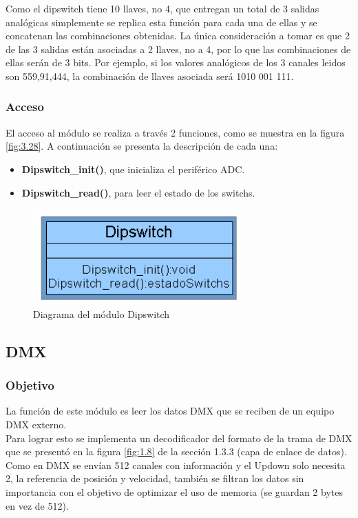 Como el dipswitch tiene 10 llaves, no 4, que entregan un total de 3 salidas analógicas simplemente se replica esta función para cada una de ellas y se concatenan las combinaciones obtenidas. La única consideración a tomar es que 2 de las 3 salidas están asociadas a 2 llaves, no a 4, por lo que las combinaciones de ellas serán de 3 bits. Por ejemplo, si los valores analógicos de los 3 canales leidos son 559,91,444, la combinación de llaves asociada será 1010 001 111.

\subsubsection{Acceso}
El acceso al módulo se realiza a través 2 funciones, como se muestra en la figura \ref{fig:3.28}. A continuación se presenta la descripción de cada una:
\begin{itemize}
	\item \textbf{Dipswitch\_init()}, que inicializa el periférico ADC.
	\item \textbf{Dipswitch\_read()}, para leer el estado de los switchs.
\end{itemize}

\begin{figure}[!ht]
	\centering
	\includegraphics[width=8cm,scale=1]{resources/3_28-moduloDipswitch.png}
	\caption{Diagrama del módulo Dipswitch}
	\label{fig:\thefigure}
\end{figure}

\subsection{DMX}
\subsubsection{Objetivo}
La función de este módulo es leer los datos DMX que se reciben de un equipo DMX externo. \\
Para lograr esto se implementa un decodificador del formato de la trama de DMX que se presentó en la figura \ref{fig:1.8} de la sección 1.3.3 (capa de enlace de datos). Como en DMX se envían 512 canales con información y el Updown solo necesita 2, la referencia de posición y velocidad, también se filtran los datos sin importancia con el objetivo de optimizar el uso de memoria (se guardan 2 bytes en vez de 512).

